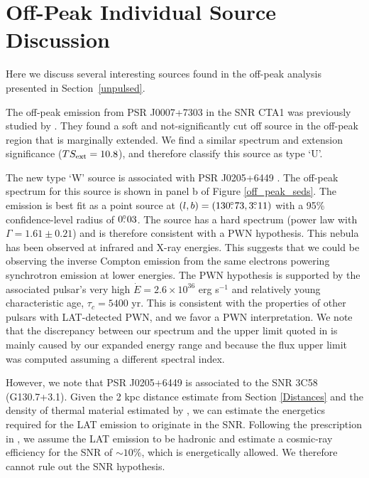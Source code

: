 \section{Off-Peak Individual Source Discussion}

Here we discuss several interesting sources found in the off-peak
analysis presented in Section~\ref{unpulsed}.

The off-peak emission from PSR J0007+7303 in the SNR CTA1 was previously studied by \cite{Fermi_CTA1_2012}.
They found a soft and not-significantly cut off source in the off-peak region that
is marginally extended.
We find a similar spectrum and extension significance ($TS_{\rm ext}=10.8$), and therefore classify this
source as type `U'.


The new type `W' source is associated with PSR J0205+6449 \citep{LATPSR0205}.
The off-peak spectrum for this source is shown in panel b of Figure
\ref{off_peak_seds}.  The emission is best fit as a point source at
$(l,b)=(130\mbox{$.\!\!^\circ$}73,3\mbox{$.\!\!^\circ$}11)$ with a 95\% confidence-level radius of $0\mbox{$.\!\!^\circ$}03$.
The source has a hard spectrum (power law with $\Gamma=1.61\pm0.21$)
and is therefore consistent with a PWN hypothesis.
This nebula has been observed at infrared
\citep{3C58_IR_PWN} and X-ray \citep{3C58_Xray_PWN} energies. This
suggests that we could be observing the inverse Compton emission from
the same electrons powering synchrotron emission at lower energies.
The PWN hypothesis is supported by the associated pulsar's
very high $\dot E=2.6\times10^{36}$ erg s$^{-1}$ and relatively young
characteristic age, $\tau_c = 5400$ yr. This is consistent with the properties
of other pulsars with LAT-detected PWN, and we favor a PWN
interpretation.
We note that the discrepancy between our spectrum and the upper limit
quoted in \citet{LAT_collaboration_PWNCAT_2011} is mainly caused by
our expanded energy range and because the flux upper limit was computed
assuming a different spectral index.


However, we note that PSR J0205+6449 is associated to the SNR 3C58
(G130.7+3.1).  Given the 2 kpc distance estimate from Section \ref{Distances}
and the density of thermal material estimated by \cite{3C58_Xray_PWN}, we can estimate
the energetics required for the LAT emission to originate in the SNR.
Following the prescription in \cite{Gamma_Visibility_SNRs_Drury_1994},
we assume the LAT emission to be hadronic and estimate a cosmic-ray
efficiency for the SNR of $\sim10$\%, which is energetically allowed.
We therefore cannot rule out the SNR hypothesis.

